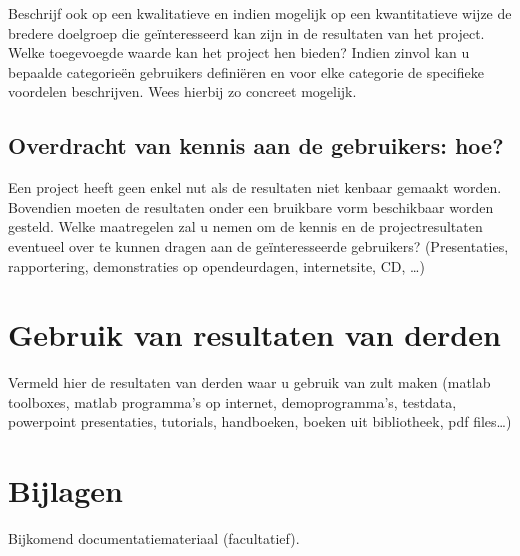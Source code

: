 \documentclass[10pt]{article}
\begin{document}
Beschrijf  ook op een kwalitatieve en indien mogelijk op een kwantitatieve wijze de bredere doelgroep die ge\"interesseerd kan zijn in de resultaten van het project. Welke toegevoegde waarde kan het project hen bieden?  Indien zinvol kan u bepaalde categorie\"en gebruikers defini\"eren en voor elke categorie de specifieke voordelen beschrijven. Wees hierbij zo concreet mogelijk. 


\subsection{Overdracht van kennis aan de gebruikers: hoe?}\label{sec:Overdracht}

Een project heeft geen enkel nut als de resultaten niet kenbaar gemaakt worden. Bovendien moeten de resultaten onder een bruikbare vorm beschikbaar worden gesteld. Welke maatregelen zal u nemen om de kennis en de projectresultaten eventueel over te kunnen dragen aan de ge\"interesseerde gebruikers? (Presentaties, rapportering, demonstraties op opendeurdagen, internetsite, CD, \ldots) 

\section{Gebruik van resultaten van derden}\label{sec:Gebruik}

Vermeld hier de resultaten van derden waar u gebruik van zult maken (matlab toolboxes, matlab programma's op internet, demoprogramma's, testdata, powerpoint presentaties, tutorials, handboeken, boeken uit bibliotheek, pdf files\ldots) 

\section{Bijlagen} \label{sec:Bijlagen}
Bijkomend documentatiemateriaal (facultatief). 
\end{document}
